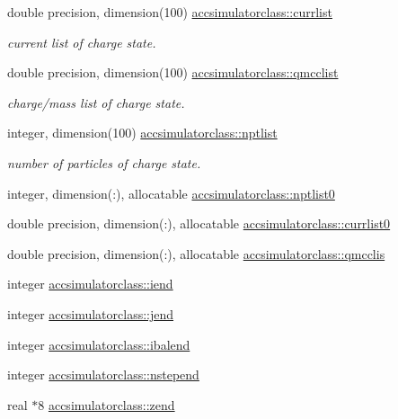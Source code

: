 \begin{DoxyCompactItemize}
double precision, dimension(100) \mbox{\hyperlink{namespaceaccsimulatorclass_a8c7c321579304f645389a08a8725f241}{accsimulatorclass\+::currlist}}
\begin{DoxyCompactList}\small\item\em current list of charge state. \end{DoxyCompactList}\item 
double precision, dimension(100) \mbox{\hyperlink{namespaceaccsimulatorclass_a41077f15e4eaaf833944e89b231a9df9}{accsimulatorclass\+::qmcclist}}
\begin{DoxyCompactList}\small\item\em charge/mass list of charge state. \end{DoxyCompactList}\item 
integer, dimension(100) \mbox{\hyperlink{namespaceaccsimulatorclass_a891a5868a86440d94c4eb40df9f3b8b9}{accsimulatorclass\+::nptlist}}
\begin{DoxyCompactList}\small\item\em number of particles of charge state. \end{DoxyCompactList}\item 
integer, dimension(\+:), allocatable \mbox{\hyperlink{namespaceaccsimulatorclass_a9fa9911cc9d2b1442c2d6a945394fc7a}{accsimulatorclass\+::nptlist0}}
\item 
double precision, dimension(\+:), allocatable \mbox{\hyperlink{namespaceaccsimulatorclass_accc2494fdb269aeeba10e0f6eea90690}{accsimulatorclass\+::currlist0}}
\item 
double precision, dimension(\+:), allocatable \mbox{\hyperlink{namespaceaccsimulatorclass_a6dce29a29cf7312e80b95b700300e37d}{accsimulatorclass\+::qmcclis}}
\item 
integer \mbox{\hyperlink{namespaceaccsimulatorclass_aa5a33a2f7563789fd061ef4e28d010a5}{accsimulatorclass\+::iend}}
\item 
integer \mbox{\hyperlink{namespaceaccsimulatorclass_aaf128f52875dead988078d4645537192}{accsimulatorclass\+::jend}}
\item 
integer \mbox{\hyperlink{namespaceaccsimulatorclass_a9b454cb233fe47004ba9388d9c495805}{accsimulatorclass\+::ibalend}}
\item 
integer \mbox{\hyperlink{namespaceaccsimulatorclass_a3efdd317f3f447eb0e9af6118c312cb5}{accsimulatorclass\+::nstepend}}
\item 
real $\ast$8 \mbox{\hyperlink{namespaceaccsimulatorclass_a36e211bc045925eb053915a15d72ea4f}{accsimulatorclass\+::zend}}
\end{DoxyCompactItemize}
